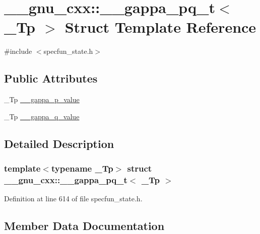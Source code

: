 \hypertarget{struct____gnu__cxx_1_1____gappa__pq__t}{}\section{\+\_\+\+\_\+gnu\+\_\+cxx\+:\+:\+\_\+\+\_\+gappa\+\_\+pq\+\_\+t$<$ \+\_\+\+Tp $>$ Struct Template Reference}
\label{struct____gnu__cxx_1_1____gappa__pq__t}


{\ttfamily \#include $<$specfun\+\_\+state.\+h$>$}

\subsection*{Public Attributes}
\begin{DoxyCompactItemize}
\item 
\+\_\+\+Tp \hyperlink{struct____gnu__cxx_1_1____gappa__pq__t_a73fcc1e1029dd11fad960b142b98f3cf}{\+\_\+\+\_\+gappa\+\_\+p\+\_\+value}
\item 
\+\_\+\+Tp \hyperlink{struct____gnu__cxx_1_1____gappa__pq__t_afd7d83a4e618ca4b710c952638951714}{\+\_\+\+\_\+gappa\+\_\+q\+\_\+value}
\end{DoxyCompactItemize}


\subsection{Detailed Description}
\subsubsection*{template$<$typename \+\_\+\+Tp$>$\newline
struct \+\_\+\+\_\+gnu\+\_\+cxx\+::\+\_\+\+\_\+gappa\+\_\+pq\+\_\+t$<$ \+\_\+\+Tp $>$}



Definition at line 614 of file specfun\+\_\+state.\+h.



\subsection{Member Data Documentation}
\mbox{\label{struct____gnu__cxx_1_1____gappa__pq__t_a73fcc1e1029dd11fad960b142b98f3cf}} 
